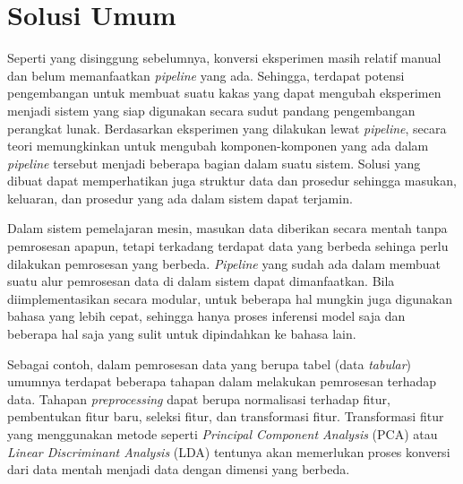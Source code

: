 \section{Solusi Umum}

Seperti yang disinggung sebelumnya, konversi eksperimen masih relatif manual dan belum memanfaatkan \textit{pipeline} yang ada.
Sehingga, terdapat potensi pengembangan untuk membuat suatu kakas yang dapat mengubah eksperimen menjadi sistem yang siap digunakan secara sudut pandang pengembangan perangkat lunak.
Berdasarkan eksperimen yang dilakukan lewat \textit{pipeline}, secara teori memungkinkan untuk mengubah komponen-komponen yang ada dalam \textit{pipeline} tersebut menjadi beberapa bagian dalam suatu sistem.
Solusi yang dibuat dapat memperhatikan juga struktur data dan prosedur sehingga masukan, keluaran, dan prosedur yang ada dalam sistem dapat terjamin.

Dalam sistem pemelajaran mesin, masukan data diberikan secara mentah tanpa pemrosesan apapun, tetapi terkadang terdapat data yang berbeda sehinga perlu dilakukan pemrosesan yang berbeda.
\textit{Pipeline} yang sudah ada dalam membuat suatu alur pemrosesan data di dalam sistem dapat dimanfaatkan.
Bila diimplementasikan secara modular, untuk beberapa hal mungkin juga digunakan bahasa yang lebih cepat, sehingga hanya proses inferensi model saja dan beberapa hal saja yang sulit untuk dipindahkan ke bahasa lain.

Sebagai contoh, dalam pemrosesan data yang berupa tabel (data \textit{tabular}) umumnya terdapat beberapa tahapan dalam melakukan pemrosesan terhadap data.
Tahapan \textit{preprocessing} dapat berupa normalisasi terhadap fitur, pembentukan fitur baru, seleksi fitur, dan transformasi fitur.
Transformasi fitur yang menggunakan metode seperti \textit{Principal Component Analysis} (PCA) atau \textit{Linear Discriminant Analysis} (LDA) tentunya akan memerlukan proses konversi dari data mentah menjadi data dengan dimensi yang berbeda.